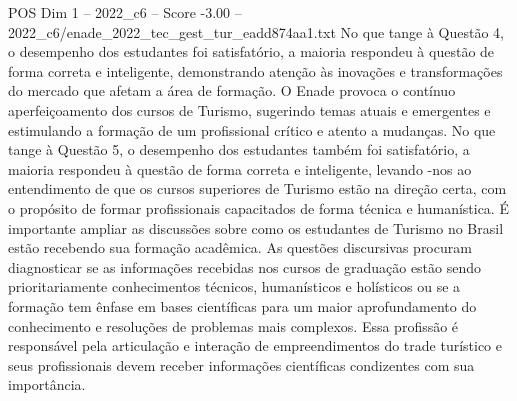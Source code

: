 \begin{textsample}{POS Dim 1 – 2022\_c6 – Score -3.00 – 2022\_c6/enade\_2022\_tec\_gest\_tur\_eadd874aa1.txt}
No que tange à Questão 4, o desempenho dos estudantes foi satisfatório, a maioria respondeu à questão de forma correta e inteligente, demonstrando atenção às inovações e transformações do mercado que afetam a área de formação.
O Enade provoca o contínuo aperfeiçoamento dos cursos de Turismo, sugerindo temas atuais e emergentes e estimulando a formação de um profissional crítico e atento a mudanças.
No que tange à Questão 5, o desempenho dos estudantes também foi satisfatório, a maioria respondeu à questão de forma correta e inteligente, levando -nos ao entendimento de que os cursos superiores de Turismo estão na direção certa, com o propósito de formar profissionais capacitados de forma técnica e humanística.
É importante ampliar as discussões sobre como os estudantes de Turismo no Brasil estão recebendo sua formação acadêmica.
As questões discursivas procuram diagnosticar se as informações recebidas nos cursos de graduação estão sendo prioritariamente conhecimentos técnicos, humanísticos e holísticos ou se a formação tem ênfase em bases científicas para um maior aprofundamento do conhecimento e resoluções de problemas mais complexos.
Essa profissão é responsável pela articulação e interação de empreendimentos do trade turístico e seus profissionais devem receber informações científicas condizentes com sua importância.

\end{textsample}
